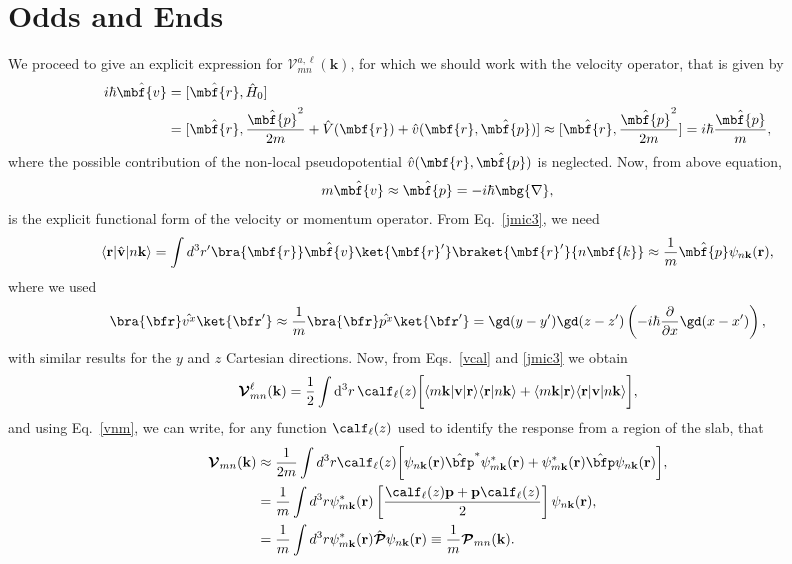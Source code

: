 \section{Odds and Ends}
We proceed to give an explicit expression for 
$\mathcal{V}^{a,\ell}_{mn}(\mathbf{k})$,
for which we should work with  
the velocity operator, that is given by
\begin{align}\label{vop2} 
i\hbar\hat{\mbf{v}}&=[\hat{\mbf{r}},\hat{H}_0]
\nonumber\\
&=
[\hat{\mbf{r}},\frac{\hat{\mbf{p}}^2}{2m} +
\hat{V}(\mbf{r})+\hat{v}(\mbf{r},\hat{\mbf{p}})]
\approx
[\hat{\mbf{r}},\frac{\hat{\mbf{p}}^2}{2m}]=i\hbar\frac{\hat{\mbf{p}}}{m},
\end{align} 
where the possible contribution of 
the non-local pseudopotential $\hat{v}(\mbf{r},\hat{\mbf{p}})$
is neglected. Now, from above equation,
\begin{equation}\label{velo}
m\hat{\mbf{v}}\approx\hat{\mbf{p}}=-i\hbar\mbg{\nabla},
\end{equation}
is the explicit functional form of the velocity or momentum operator.
From Eq.~\eqref{jmic3}, we need 
\begin{equation}\label{vnm}
\langle \mathbf{r} | \hat{\mathbf v} | n\mathbf{k} \rangle
=\int d^3 r' \bra{\mbf{r}}\hat{\mbf{v}}\ket{\mbf{r}'}
\braket{\mbf{r}'}{n\mbf{k}}
\approx\frac{1}{m}\hat{\mbf{p}}\psi_{n\mathbf{k}}(\mathbf{r}),
\end{equation} 
where we used 
\begin{equation}\label{rvnk}
\bra{\bfr}\hat{v^x}\ket{\bfr'}
\approx \frac{1}{m}\bra{\bfr}\hat{p^x}\ket{\bfr'}
=
\gd(y-y')\gd(z-z')\left(-i\hbar\frac{\partial}{\partial x}\gd(x-x')\right),
\end{equation}
with similar results for the $y$ and $z$ Cartesian directions.
Now, from 
Eqs.~\eqref{vcal} and \eqref{jmic3} we obtain
\begin{equation}
{\boldsymbol{\mathcal{V}}}^{\ell}_{mn}({\mathbf k})=
\frac{1}{2}
\int \mathrm{d}^3 r\,
 \calf_\ell(z)
\bigg[
\langle m\mathbf{k}|\mathbf{v} | \mathbf{r}\rangle
\langle \mathbf{r} | n \mathbf k \rangle +
\langle m\mathbf{k} | \mathbf{r}\rangle
\langle \mathbf{r} | \mathbf{v} | n \mathbf k \rangle\bigg],
\label{intj}
\end{equation}   
and using Eq.~\eqref{vnm},
we can write, for any  function $\calf_\ell(z)$ used
to identify the response from a region of the slab, that
\begin{align}\label{pofs}
{\boldsymbol{\mathcal{V}}}_{mn}(\mathbf{k})&\approx
\frac{1}{2m}\int d^3 r
\calf_\ell(z)
 \bigg[
\psi_{n\mathbf{k}}(\mathbf{r})
\hat\bfp^*\psi^*_{m\mathbf{k}}(\mathbf{r})
+ 
\psi^*_{m\mathbf{k}}(\mathbf{r})\hat\bfp
\psi_{n\mathbf{k}}(\mathbf{r})
\bigg], \label{pofs1}  \\
&=
\frac{1}{m}\int d^3 r
\psi^*_{m\mathbf{k}}(\mathbf{r})
\left[\frac{\calf_\ell(z) \mathbf{p} +
\mathbf{p} \calf_\ell(z)}{2}\right]
\psi_{n\mathbf{k}}(\mathbf{r})
,\label{pofs2} \\
&=\frac{1}{m}\int d^3 r
\psi^*_{m\mathbf{k}}(\mathbf{r})\hat{\boldsymbol{\mathcal{P}}}
\psi_{n\mathbf{k}}(\mathbf{r})\equiv \frac{1}{m}{\boldsymbol{\mathcal{P}}}_{mn}(\mathbf{k}).
\end{align}
